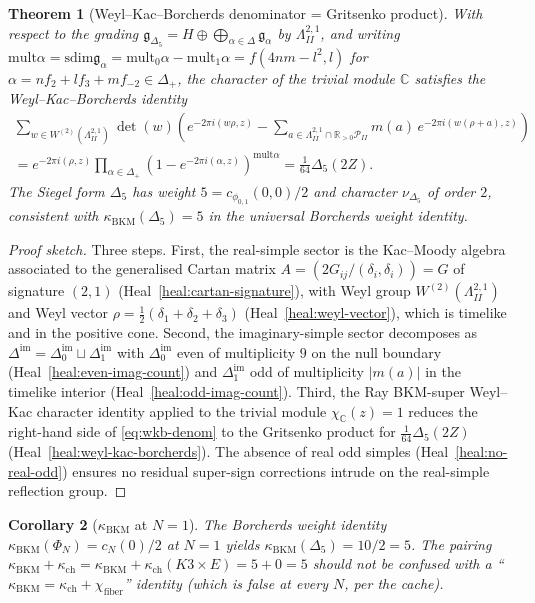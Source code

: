 \documentclass[11pt]{article}
\newtheorem{theorem}{Theorem}
\newtheorem{corollary}[theorem]{Corollary}
\theoremstyle{definition}
\providecommand{\C}{\mathbb{C}}
\providecommand{\R}{\mathbb{R}}
\providecommand{\g}{\mathfrak{g}}
\providecommand{\mult}{\mathrm{mult}}
\providecommand{\sdim}{\mathrm{sdim}}
\providecommand{\LII}{\Lambda^{2,1}_{I\!I}}
\providecommand{\PII}{\mathcal{P}_{I\!I}}
\providecommand{\dim}{\Delta^{\mathrm{im}}}
\providecommand{\kBKM}{\kappa_{\mathrm{BKM}}}
\providecommand{\kch}{\kappa_{\mathrm{ch}}}
\providecommand{\Deltafive}{\Delta_5}
\providecommand{\phionezero}{\phi_{0,1}}
\begin{document}
\begin{theorem}[Weyl--Kac--Borcherds denominator = Gritsenko product]
\label{thm:gkm-denom-delta5}
With respect to the grading $\g_{\Deltafive}=H\oplus\bigoplus_{\alpha\in\Delta}\g_\alpha$
by $\LII$, and writing
$\mult\alpha=\sdim\g_\alpha=\mult_0\alpha-\mult_1\alpha=f(4nm-l^2,l)$
for $\alpha= n f_2+l f_3+m f_{-2}\in\Delta_+$, the character of the
trivial module $\C$ satisfies the Weyl--Kac--Borcherds identity
\begin{multline}
\label{eq:wkb-denom}
\sum_{w\in W^{(2)}(\LII)}\!\!\det(w)\!\left(
e^{-2\pi i(w\rho,z)} - \!\!\!\sum_{a\in\LII\cap\R_{>0}\PII}\!\!m(a)\,
e^{-2\pi i(w(\rho+a),z)}
\right)\\
= e^{-2\pi i(\rho,z)}
\prod_{\alpha\in\Delta_+}\!(1-e^{-2\pi i(\alpha,z)})^{\mult\alpha}
= \tfrac{1}{64}\Deltafive(2Z).
\end{multline}
The Siegel form $\Deltafive$ has weight $5=c_{\phionezero}(0,0)/2$ and
character $\nu_{\Deltafive}$ of order $2$, consistent with
$\kBKM(\Deltafive)=5$ in the universal Borcherds weight identity.
\end{theorem}

\begin{proof}[Proof sketch]
Three steps. First, the real-simple sector is the Kac--Moody algebra
associated to the generalised Cartan matrix
$A=(2G_{ij}/(\delta_i,\delta_i))=G$ of signature $(2,1)$
(Heal~\ref{heal:cartan-signature}), with Weyl group $W^{(2)}(\LII)$ and
Weyl vector $\rho=\tfrac12(\delta_1+\delta_2+\delta_3)$
(Heal~\ref{heal:weyl-vector}), which is timelike and in the positive
cone. Second, the imaginary-simple sector decomposes as
$\dim=\dim_0\sqcup\dim_1$ with $\dim_0$ even of multiplicity $9$ on the
null boundary (Heal~\ref{heal:even-imag-count}) and $\dim_1$ odd of
multiplicity $|m(a)|$ in the timelike interior
(Heal~\ref{heal:odd-imag-count}). Third, the Ray BKM-super Weyl--Kac
character identity applied to the trivial module $\chi_{\C}(z)=1$
reduces the right-hand side of \eqref{eq:wkb-denom} to the Gritsenko
product for $\tfrac{1}{64}\Deltafive(2Z)$
(Heal~\ref{heal:weyl-kac-borcherds}). The absence of real odd simples
(Heal~\ref{heal:no-real-odd}) ensures no residual super-sign corrections
intrude on the real-simple reflection group.
\end{proof}

\begin{corollary}[$\kBKM$ at $N=1$]
\label{cor:kbkm-N1}
The Borcherds weight identity $\kBKM(\Phi_N)=c_N(0)/2$ at $N=1$ yields
$\kBKM(\Deltafive)=10/2=5$. The pairing
$\kBKM+\kch=\kBKM+\kch(K3\times E)=5+0=5$ should not be confused with a
``$\kBKM=\kch+\chi_{\mathrm{fiber}}$'' identity (which is false at
every $N$, per the cache).
\end{corollary}
\end{document}
